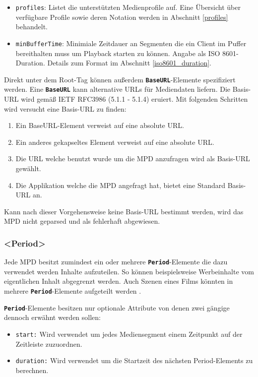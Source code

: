 \documentclass[paper = a4, fontsize = 12pt, parskip = half]{scrartcl} %
\def\attr#1{\texttt{#1}}
\def\elem#1{\texttt{\textbf{#1}}}
\begin{document}
\begin{itemize}
	\item \attr{profiles}: Listet die unterstützten Medienprofile auf. Eine Übersicht über verfügbare Profile sowie deren Notation werden in Abschnitt \ref{profiles} behandelt.
	\item \attr{minBufferTime}: Minimiale Zeitdauer an Segmenten die ein Client im Puffer bereithalten muss um Playback starten zu können. Angabe als ISO 8601-Duration. Details zum Format im Abschnitt \ref{iso8601_duration}.
\end{itemize}

Direkt unter dem Root-Tag können außerdem \elem{BaseURL}-Elemente spezifiziert werden. Eine \elem{BaseURL} kann alternative URLs für Mediendaten liefern.
Die Basis-URL wird gemäß IETF RFC3986 (5.1.1 - 5.1.4) eruiert. Mit folgenden Schritten wird versucht eine Basis-URL zu finden:

\begin{enumerate}
	\item Ein BaseURL-Element verweist auf eine absolute URL.
	\item Ein anderes gekapseltes Element verweist auf eine absolute URL. 
	\item Die URL welche benutzt wurde um die MPD anzufragen wird als Basis-URL gewählt.
	\item Die Applikation welche die MPD angefragt hat, bietet eine Standard Basis-URL an.
\end{enumerate}

Kann nach dieser Vorgehensweise keine Basis-URL bestimmt werden, wird das MPD nicht geparsed und als fehlerhaft abgewiesen.

\subsubsection{<Period>}
Jede MPD besitzt zumindest ein oder mehrere \elem{Period}-Elemente die dazu verwendet werden Inhalte aufzuteilen. So können beispielsweise Werbeinhalte vom eigentlichen Inhalt abgegrenzt werden. Auch Szenen eines Films könnten in mehrere \elem{Period}-Elemente aufgeteilt werden \cite{international_organization_for_standardization_isoiec_nodate}.

\elem{Period}-Elemente besitzen nur optionale Attribute von denen zwei gängige dennoch erwähnt werden sollen:
\begin{itemize}
	\item \attr{start:} Wird verwendet um jedes Mediensegment einem Zeitpunkt auf der Zeitleiste zuzuordnen.
	\item \attr{duration:} Wird verwendet um die Startzeit des nächsten Period-Elements zu berechnen.
\end{itemize}
\end{document}
